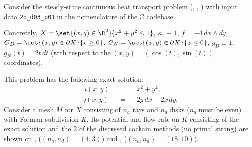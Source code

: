 \begin{example}
  \label{cmc/diffusion/continuous/steady_state/examples/2d_d03_p01-example}
  Consider the steady-state continuous heat transport problem
  (,
   ,
   )
  with input data \verb|2d_d03_p01| in the nomenclature of the C codebase.

  Concretely,
    $X = \set{(x, y) \in \R^2}{x^2 + y^2 \leq 1}$,
    $\kappa_1 \equiv 1$,
    $f = - 4 \, d x \wedge d y$,
    $G_D = \set{(x, y) \in \partial X}{x \geq 0}$,
    $G_N = \set{(x, y) \in \partial X}{x \leq 0}$,
    $g_D \equiv 1$,
    $g_N(t) = 2 t \, d t$
    (with respect to the $(x, y) = (\cos(t), \sin(t))$ coordinates).

  This problem has the following exact solution:
  \begin{subequations}
    \begin{alignat}{3}
      & u(x, y) && = && x^2 + y^2, \\
      & q(x, y) && = && 2 y \, d x - 2 x \, d y.
    \end{alignat}
  \end{subequations}
  Consider a mesh $M$ for $X$ consisting of $n_a$ rays and $n_d$ disks
  ($n_a$ must be even) with Forman subdivision $K$.
  Its potential and flow rate on $K$ consisting of the exact solution and the
  $2$ of the discussed cochain methods (no primal strong) are shown on
  ,
  ($(n_a, n_d) = (4, 3)$)
  and
  ,
  ($(n_a, n_d) = (18, 10)$).
\end{example}
